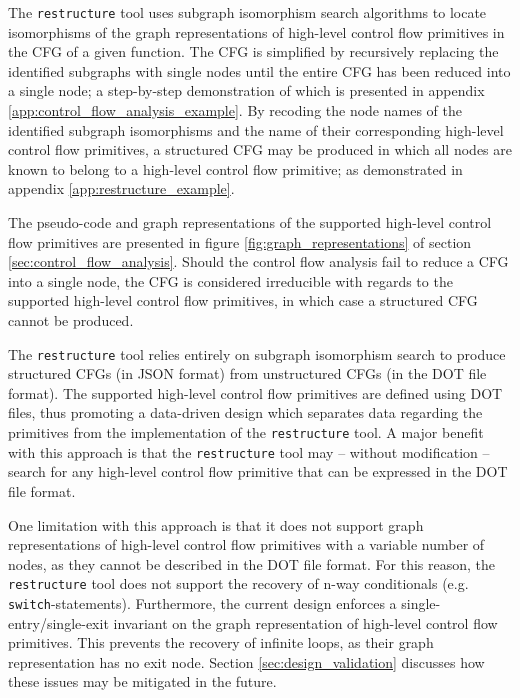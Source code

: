 The \texttt{restructure} tool uses subgraph isomorphism search algorithms to locate isomorphisms of the graph representations of high-level control flow primitives in the CFG of a given function. The CFG is simplified by recursively replacing the identified subgraphs with single nodes until the entire CFG has been reduced into a single node; a step-by-step demonstration of which is presented in appendix \ref{app:control_flow_analysis_example}. By recoding the node names of the identified subgraph isomorphisms and the name of their corresponding high-level control flow primitives, a structured CFG may be produced in which all nodes are known to belong to a high-level control flow primitive; as demonstrated in appendix \ref{app:restructure_example}.

The pseudo-code and graph representations of the supported high-level control flow primitives are presented in figure \ref{fig:graph_representations} of section \ref{sec:control_flow_analysis}. Should the control flow analysis fail to reduce a CFG into a single node, the CFG is considered irreducible with regards to the supported high-level control flow primitives, in which case a structured CFG cannot be produced.

The \texttt{restructure} tool relies entirely on subgraph isomorphism search to produce structured CFGs (in JSON format) from unstructured CFGs (in the DOT file format). The supported high-level control flow primitives are defined using DOT files, thus promoting a data-driven design which separates data regarding the primitives from the implementation of the \texttt{restructure} tool. A major benefit with this approach is that the \texttt{restructure} tool may -- without modification -- search for any high-level control flow primitive that can be expressed in the DOT file format.

One limitation with this approach is that it does not support graph representations of high-level control flow primitives with a variable number of nodes, as they cannot be described in the DOT file format. For this reason, the \texttt{restructure} tool does not support the recovery of n-way conditionals (e.g. \texttt{switch}-statements). Furthermore, the current design enforces a single-entry/single-exit invariant on the graph representation of high-level control flow primitives. This prevents the recovery of infinite loops, as their graph representation has no exit node. Section \ref{sec:design_validation} discusses how these issues may be mitigated in the future.
